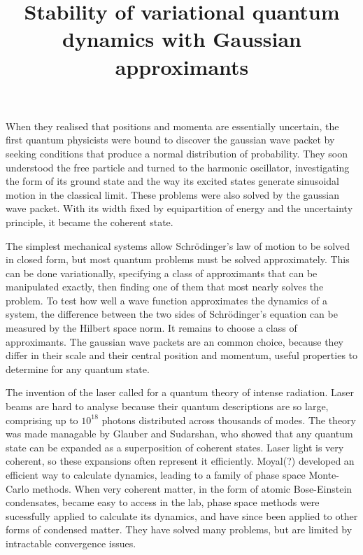 \nonstopmode


 \tenrm

\title{Stability of variational quantum dynamics with Gaussian approximants}

\def\G{|Γ〉}
\def\Gx{|Γ_χ〉}
\def\cite#1{$[\hbox{\tt #1}]$}


When they realised that positions and momenta are essentially uncertain, the first quantum physicists were bound to discover the gaussian wave packet by seeking conditions that produce a normal distribution of probability.  They soon understood the free particle and turned to the harmonic oscillator, investigating the form of its ground state and the way its excited states generate sinusoidal motion in the classical limit.  These problems were also solved by the gaussian wave packet.  With its width fixed by equipartition of energy and the uncertainty principle, it became the coherent state.

The simplest mechanical systems allow Schrödinger's law of motion to be solved in closed form, but most quantum problems must be solved approximately.  This can be done variationally, specifying a class of approximants that can be manipulated exactly, then finding one of them that most nearly solves the problem.  To test how well a wave function approximates the dynamics of a system, the difference between the two sides of Schrödinger's equation can be measured by the Hilbert space norm.  It remains to choose a class of approximants.  The gaussian wave packets are an common choice, because they differ in their scale and their central position and momentum, useful properties to determine for any quantum state.

The invention of the laser called for a quantum theory of intense radiation.  Laser beams are hard to analyse because their quantum descriptions are so large, comprising up to $10^{18}$ photons distributed across thousands of modes.  The theory was made managable by Glauber and Sudarshan, who showed that any quantum state can be expanded as a superposition of coherent states.  Laser light is very coherent, so these expansions often represent it efficiently.  Moyal(?) developed an efficient way to calculate dynamics, leading to a family of phase space Monte-Carlo methods.  When very coherent matter, in the form of atomic Bose-Einstein condensates, became easy to access in the lab, phase space methods were sucessfully applied to calculate its dynamics, and have since been applied to other forms of condensed matter.  They have solved many problems, but are limited by intractable convergence issues.

